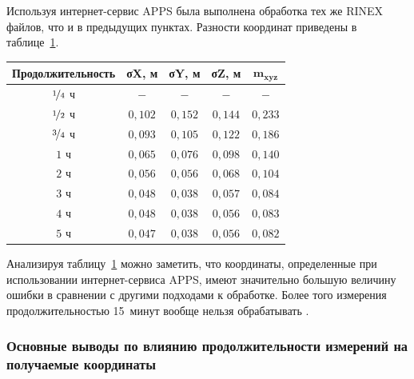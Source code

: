 Используя интернет-сервис APPS была выполнена обработка тех же RINEX файлов, что и в предыдущих пунктах. Разности координат приведены в таблице~\cref{tab:tab17}.


\begin{table} [htbp]
	\centering\small
	\label{tab:tab17}{%
			\begin{tabular}{|c|c|c|c|c|}
				\hline
				\textbf{Продолжительность} & \textbf{σX, м}   & \textbf{σY, м} & \textbf{σZ, м} & $\mathbf{m_{xyz}}$ \\ \hline
				$\nicefrac{1}{4}$ ч        & $-$              & $-$            & $-$            & $-$                \\ \hline
				$\nicefrac{1}{2}$ ч        & $0,102$          & $0,152$        & $0,144$        & $0,233$            \\ \hline
				$\nicefrac{3}{4}$ ч        & $0,093$          & $0,105$        & $0,122$        & $0,186$            \\ \hline
				$1$ ч                      & $0,065$          & $0,076$        & $0,098$        & $0,140$            \\ \hline
				$2$ ч                      & $0,056$          & $0,056$        & $0,068$        & $0,104$            \\ \hline
				$3$ ч                      & $0,048$          & $0,038$        & $0,057$        & $0,084$            \\ \hline
				$4$ ч	                   & $0,048$          & $0,038$        & $0,056$        & $0,083$            \\ \hline
				$5$ ч                      & $0,047$          & $0,038$        & $0,056$        & $0,082$            \\ \hline
			\end{tabular}
		}
	\end{table}


Анализируя таблицу~\cref{tab:tab17} можно заметить, что координаты, определенные при использовании интернет-сервиса APPS, имеют значительно большую величину ошибки в сравнении с другими подходами к обработке. Более того измерения продолжительностью  15~минут вообще нельзя обрабатывать \cite{mak03,mak06}.




\subsubsection{Основные выводы по влиянию продолжительности измерений на получаемые координаты }\label{subsec:ch2/sec3/sub2/sub4}

